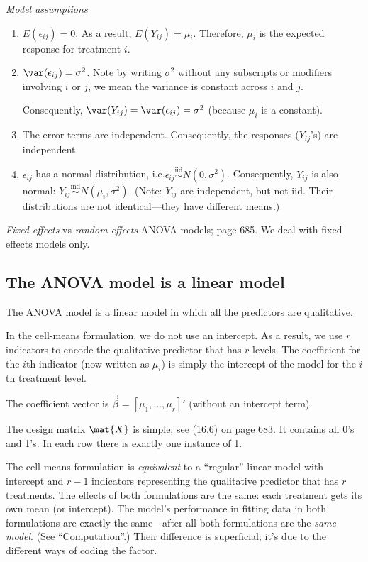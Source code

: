 \documentclass[12pt]{article}
\begin{document}
\emph{Model assumptions}
\begin{enumerate}
\item $E(\epsilon_{ij}) = 0$. As a result, $E(Y_{ij}) = \mu_i$.
Therefore, $\mu_i$ is the expected response for treatment $i$.
\item $\var(\epsilon_{ij}) = \sigma^2$. Note by writing $\sigma^2$ without
any subscripts or modifiers involving $i$ or $j$, we mean the variance
is constant across $i$ and $j$.

Consequently, $\var(Y_{ij}) = \var(\epsilon_{ij}) = \sigma^2$ (because
$\mu_i$ is a constant).

\item The error terms are independent.
Consequently, the responses ($Y_{ij}$'s) are independent.

\item $\epsilon_{ij}$ has a normal distribution,
i.e.\@ $\epsilon_{ij} \overset{\text{iid}}{\sim} N(0, \sigma^2)$.
Consequently, $Y_{ij}$ is also normal:
$Y_{ij} \overset{\text{ind}}{\sim} N(\mu_i, \sigma^2)$.
(Note: $Y_{ij}$ are independent, but not iid. Their distributions
are not identical---they have different means.)
\end{enumerate}

\emph{Fixed effects} vs \emph{random effects} ANOVA models; page 685.
We deal with fixed effects models only.


\subsection{The ANOVA model is a linear model}

The ANOVA model is a linear model in which all the predictors are
qualitative.

In the cell-means formulation, we do not use an intercept.
As a result, we use $r$ indicators to encode the qualitative predictor
that has $r$ levels.
The coefficient for the $i$th indicator
(now written as $\mu_i$)
is simply the intercept of the model for the $i$th treatment level.

The coefficient vector is $\vec{\beta} = [\mu_1,\dotsc,\mu_r]'$
(without an intercept term).

The design matrix $\mat{X}$ is simple; see (16.6) on page 683.
It contains all 0's and 1's.
In each row there is exactly one instance of 1.

\alert
The cell-means formulation is \emph{equivalent} to a
``regular'' linear model with intercept and
$r-1$ indicators representing the qualitative predictor
that has $r$ treatments.
The effects of both formulations are the same:
each treatment gets its own mean (or intercept).
The model's performance in fitting data in both formulations
are exactly the same---after all both formulations
are the \emph{same model}. (See ``Computation''.)
Their difference is superficial; it's due to
the different ways of coding the factor.
\end{document}
